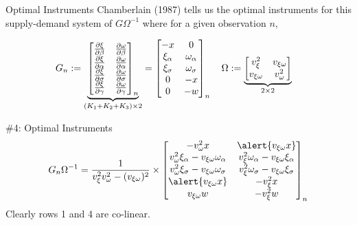 \begin{frame}{Optimal Instruments}
\noindent Chamberlain (1987) tells us the optimal instruments for this supply-demand system of $G\Omega^{-1}$ where for a given observation $n$, 

\begin{align*}
G_n &:= \underbrace{\begin{bmatrix}
\frac{\partial \xi}{\partial \beta} & \frac{\partial \omega}{\partial \beta} \\
\frac{\partial \xi}{\partial \alpha} & \frac{\partial \omega}{\partial \alpha} \\
\frac{\partial \xi}{\partial \sigma} & \frac{\partial \omega}{\partial \sigma} \\
\frac{\partial \xi}{\partial \gamma} & \frac{\partial \omega}{\partial \gamma} 
\end{bmatrix}_n}_{(K_1 + K_2 + K_3)\times 2}
= \begin{bmatrix}
-x & 0 \\
\xi_\alpha & \omega_\alpha \\
\xi_\sigma & \omega_\sigma \\
0 & -x \\
0 & -w
\end{bmatrix}_n 
\quad  
\Omega := \underbrace{\begin{bmatrix}
v_\xi^2 & v_{\xi \omega} \\
v_{\xi \omega} & v_\omega^2
\end{bmatrix}}_{2 \times 2}
\end{align*}
\end{frame}


\begin{frame}{\#4: Optimal Instruments}
\begin{align*}
G_n\Omega^{-1} = \frac{1}{v_\xi^2 v_\omega^2 - (v_{\xi \omega})^2}\times \begin{bmatrix}
-v_\omega^2 x & \alert{v_{\xi \omega}x} \\
v_\omega^2 \xi_\alpha - v_{\xi \omega}\omega_\alpha & v_\xi^2 \omega_\alpha - v_{\xi \omega}\xi_\alpha \\
v_\omega^2 \xi_\sigma - v_{\xi \omega}\omega_\sigma & v_\xi^2 \omega_\sigma - v_{\xi \omega}\xi_\sigma \\
\alert{v_{\xi \omega}x }&  -v_\xi^2 x \\
v_{\xi \omega}w & -v_\xi^2 w
\end{bmatrix}_n
\end{align*}
\noindent Clearly rows 1 and 4 are co-linear. 
\end{frame}

